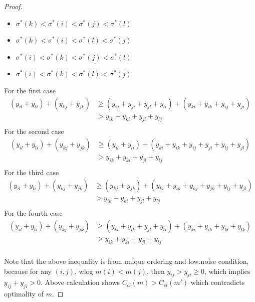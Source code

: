 \begin{proof}
\begin{itemize}
	\begin{itemize}
		\item $\sigma^*(k)<\sigma^*(i)<\sigma^*(j)<\sigma^*(l)$
			\item $\sigma^*(k)<\sigma^*(i)<\sigma^*(l)<\sigma^*(j)$
				\item $\sigma^*(i)<\sigma^*(k)<\sigma^*(j)<\sigma^*(l)$
					\item $\sigma^*(i)<\sigma^*(k)<\sigma^*(l)<\sigma^*(j)$
	\end{itemize}
For the first case
\begin{equation*}
\begin{split}
(y_{il}+y_{li})+(y_{kj}+y_{jk})&\geq (y_{ij}+y_{ji}+y_{jl}+y_{li}) + (y_{ki}+y_{ik}+y_{ij}+y_{ji})\\
&>y_{ik}+y_{ki}+y_{jl}+y_{lj}\\
\end{split}
\end{equation*}
For the second case
\begin{equation*}
\begin{split}
(y_{il}+y_{li})+(y_{kj}+y_{jk})&\geq (y_{il}+y_{li}) + (y_{ki}+y_{ik}+y_{ij}+y_{ji}+y_{lj}+y_{jl})\\
&>y_{ik}+y_{ki}+y_{jl}+y_{lj}\\
\end{split}
\end{equation*}
For the third case
\begin{equation*}
\begin{split}
(y_{il}+y_{li})+(y_{kj}+y_{jk})&\geq(y_{kj}+y_{jk}) + (y_{ki}+y_{ik}+y_{kj}+y_{jk}+y_{lj}+y_{jl})\\
&>y_{ik}+y_{ki}+y_{jl}+y_{lj}\\
\end{split}
\end{equation*}
For the fourth case
\begin{equation*}
\begin{split}
(y_{il}+y_{li})+(y_{kj}+y_{jk})&\geq (y_{kl}+y_{lk}+y_{jl}+y_{li}) + (y_{ki}+y_{ik}+y_{kl}+y_{lk})\\
&>y_{ik}+y_{ki}+y_{jl}+y_{lj}\\
\end{split}
\end{equation*}
	\end{itemize}

Note that the above inequality is from unique ordering and low.noise condition, because for any $(i,j)$, wlog $m(i)<m(j)$, then $y_{ij}>y_{ji}\geq 0$, which implies $y_{ij}+y_{ji}>0$. Above calculation shows $C_{cl}(m)>C_{cl}(m')$ which contradicts optimality of $m$.
	
\end{proof}



